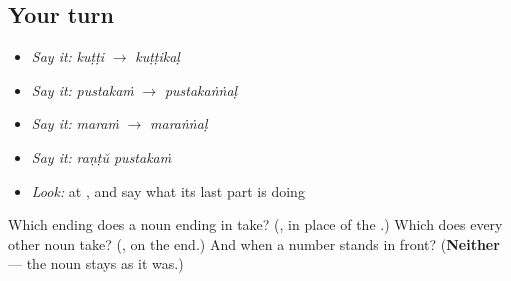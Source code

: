 \subsection*{Your turn}
\begin{itemize}
\raggedright
  \item \emph{Say it:} \emph{kuṭṭi} $\to$ \emph{kuṭṭikaḷ}
  \item \emph{Say it:} \emph{pustakaṁ} $\to$ \emph{pustakaṅṅaḷ}
  \item \emph{Say it:} \emph{maraṁ} $\to$ \emph{maraṅṅaḷ}
  \item \emph{Say it:} \emph{raṇṭŭ pustakaṁ}
  \item \emph{Look:} at \textbf{}, and say what its last part is doing
\end{itemize}

\begin{tcolorbox}[breakable,colback=teal!4,colframe=teal!35!black,title={Before you move on}]
Which ending does a noun ending in \textbf{} take? (\textbf{}, in place of the \textbf{}.) Which does every other noun take? (\textbf{}, on the end.) And when a number stands in front? (\textbf{Neither} — the noun stays as it was.)
\end{tcolorbox}
